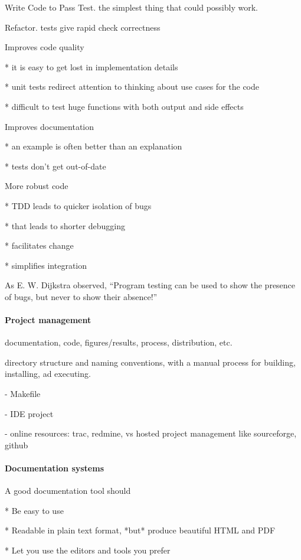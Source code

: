 \documentclass[ChapterTOCs,krantz2]{krantz} %
\begin{document}
Write Code to Pass Test. the simplest thing that could possibly work.

Refactor. tests give rapid check correctness

Improves code quality

* it is easy to get lost in implementation details

* unit tests redirect attention to thinking about use cases for the code

* difficult to test huge functions with both output and side effects

Improves documentation

* an example is often better than an explanation

* tests don't get out-of-date

More robust code

* TDD leads to quicker isolation of bugs

* that leads to shorter debugging

* facilitates change

* simplifies integration

As E. W. Dijkstra observed, ``Program testing can be used to show the presence
of bugs, but never to show their absence!'' \cite{dahl1972structured}

\paragraph{ {\bf Project management}}

documentation, code, figures/results, process, distribution, etc.

directory structure and naming conventions, with a manual process
for building, installing, ad executing.

- Makefile

- IDE project

- online resources: trac, redmine, vs hosted project management like
sourceforge, github

\paragraph{ {\bf Documentation systems}}

A good documentation tool should

* Be easy to use

* Readable in plain text format, *but* produce beautiful HTML and PDF

* Let you use the editors and tools you prefer
\end{document}

